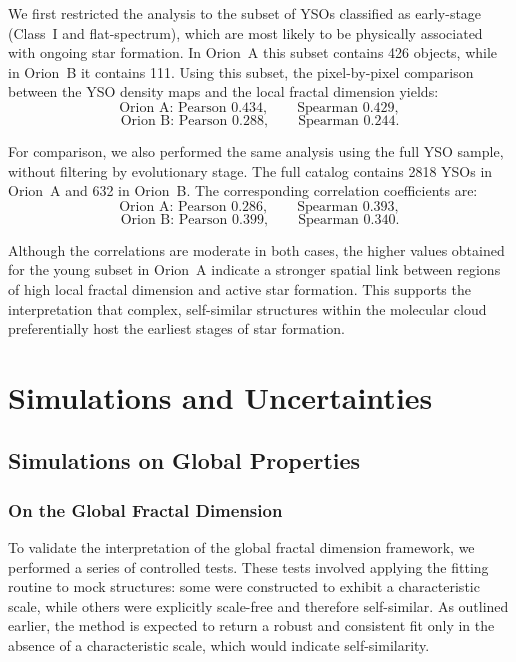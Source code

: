 We first restricted the analysis to the subset of YSOs classified as early-stage (Class~I and flat-spectrum), which are most likely to be physically associated with ongoing star formation.  
In Orion~A this subset contains 426 objects, while in Orion~B it contains 111.  
Using this subset, the pixel-by-pixel comparison between the YSO density maps and the local fractal dimension yields:
\[
\text{Orion A: Pearson } 0.434, \qquad \text{Spearman } 0.429,
\]
\[
\text{Orion B: Pearson } 0.288, \qquad \text{Spearman } 0.244.
\]

For comparison, we also performed the same analysis using the full YSO sample, without filtering by evolutionary stage.  
The full catalog contains 2818 YSOs in Orion~A and 632 in Orion~B.  
The corresponding correlation coefficients are:
\[
\text{Orion A: Pearson } 0.286, \qquad \text{Spearman } 0.393,
\]
\[
\text{Orion B: Pearson } 0.399, \qquad \text{Spearman } 0.340.
\]

Although the correlations are moderate in both cases, the higher values obtained for the young subset in Orion~A indicate a stronger spatial link between regions of high local fractal dimension and active star formation.  
This supports the interpretation that complex, self-similar structures within the molecular cloud preferentially host the earliest stages of star formation.

\section{Simulations and Uncertainties}

\subsection{Simulations on Global Properties}

\subsubsection{On the Global Fractal Dimension}

To validate the interpretation of the global fractal dimension framework, we performed a series of controlled tests.  
These tests involved applying the fitting routine to mock structures: some were constructed to exhibit a characteristic scale, while others were explicitly scale-free and therefore self-similar.  
As outlined earlier, the method is expected to return a robust and consistent fit only in the absence of a characteristic scale, which would indicate self-similarity.


